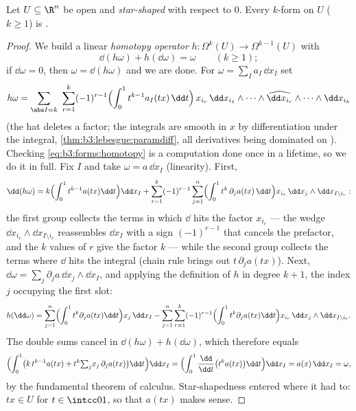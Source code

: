 \begin{theorem}\label{thm:b3:forms:poincare}
Let $U \subseteq \R^n$ be open and \emph{star-shaped} with
respect to $0$. Every  $k$-form on $U$ ($k \geq 1$) is
.
\end{theorem}

\begin{proof}
We build a linear \emph{homotopy operator} $h\colon
\Omega^k(U) \to \Omega^{k-1}(U)$ with
\begin{equation}\label{eq:b3:forms:homotopy}
\dd(h\omega) + h(\dd\omega) = \omega
\qquad (k \geq 1);
\end{equation}
if $\dd\omega = 0$, then $\omega = \dd(h\omega)$ and we are
done. For $\omega = \sum_I a_I\,\dd x_I$ set
\[
h\omega = \sum_{\abs I = k}\ \sum_{r=1}^{k}(-1)^{r-1}
\Bigl(\int_0^1 t^{k-1}a_I(tx)\,\dd t\Bigr)\,
x_{i_r}\,\dd x_{i_1}\wedge\dots\wedge
\widehat{\dd x_{i_r}}\wedge\dots\wedge\dd x_{i_k}
\]
(the hat deletes a factor; the integrals are smooth in $x$
by differentiation under the integral,
\cref{thm:b3:lebesgue:paramdiff}, all derivatives being
dominated on ). Checking
\eqref{eq:b3:forms:homotopy} is a computation done once in a
lifetime, so we do it in full. Fix $I$ and take $\omega =
a\,\dd x_I$ (linearity). First,
\[
\dd(h\omega) = k\Bigl(\int_0^1t^{k-1}a(tx)\dd t\Bigr)\dd x_I
+ \sum_{r=1}^k(-1)^{r-1}\sum_{j=1}^n
\Bigl(\int_0^1t^{k}\,\partial_ja(tx)\,\dd t\Bigr)
x_{i_r}\,\dd x_j\wedge\dd x_{I\setminus i_r} :
\]
the first group collects the terms in which $\dd$ hits the
factor $x_{i_r}$ --- the wedge $\dd x_{i_r}\wedge\dd
x_{I\setminus i_r}$ reassembles $\dd x_I$ with a sign
$(-1)^{r-1}$ that cancels the prefactor, and the $k$ values
of $r$ give the factor $k$ --- while the second group
collects the terms where $\dd$ hits the integral (chain
rule brings out $t\,\partial_ja(tx)$). Next, $\dd\omega =
\sum_j\partial_ja\,\dd x_j\wedge\dd x_I$, and applying the
definition of $h$ in degree $k+1$, the index $j$ occupying
the first slot:
\[
h(\dd\omega) = \sum_{j=1}^n\Bigl(\int_0^1t^{k}
\partial_ja(tx)\dd t\Bigr)x_j\,\dd x_I
- \sum_{j=1}^n\sum_{r=1}^k(-1)^{r-1}
\Bigl(\int_0^1t^{k}\partial_ja(tx)\dd t\Bigr)
x_{i_r}\,\dd x_j\wedge\dd x_{I\setminus i_r} .
\]
The double sums cancel in $\dd(h\omega) + h(\dd\omega)$,
which therefore equals
\[
\Bigl(\int_0^1\bigl(k\,t^{k-1}a(tx) +
t^k{\textstyle\sum_j}x_j\,\partial_ja(tx)\bigr)\dd t\Bigr)
\dd x_I
= \Bigl(\int_0^1\frac{\dd}{\dd t}\bigl(t^ka(tx)\bigr)\dd
t\Bigr)\dd x_I
= a(x)\,\dd x_I = \omega,
\]
by the fundamental theorem of calculus. Star-shapedness
entered where it had to: $tx \in U$ for $t \in \intcc01$,
so that $a(tx)$ makes sense.
\end{proof}

